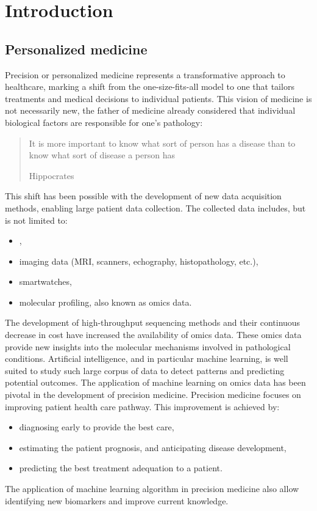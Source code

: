 \documentclass[../main.tex]{subfiles}
\begin{document}

\chapter{Introduction}
\minitoc

\section{Personalized medicine}
 Precision or personalized medicine represents a transformative approach to healthcare, marking a shift from the one-size-fits-all model to one that tailors treatments and medical decisions to individual patients.
 This vision of medicine is not necessarily new, the father of medicine already considered that individual biological factors are responsible for one's pathology: \blockquote[Hippocrates][.]{It is more important to know what sort of person has a disease than to know what sort of disease a person has}.
 This shift has been possible with the development of new data acquisition methods, enabling large patient data collection.
 The collected data includes, but is not limited to:
 \begin{itemize}[nosep]
	 \item {},
	 \item imaging data (MRI, scanners, echography, histopathology, etc.),
	 \item smartwatches,
	 \item molecular profiling, also known as omics data.
 \end{itemize}
 The development of high-throughput sequencing methods and their continuous decrease in cost have increased the availability of omics data.
 These omics data provide new insights into the molecular mechanisms involved in pathological conditions.
 Artificial intelligence, and in particular machine learning, is well suited to study such large corpus of data to detect patterns and predicting potential outcomes.
 The application of machine learning on omics data has been pivotal in the development of precision medicine.
 Precision medicine focuses on improving patient health care pathway.
 This improvement is achieved by:
 \begin{itemize}[nosep]
	 \item diagnosing early to provide the best care,
	 \item estimating the patient prognosis, and anticipating disease development,
	 \item predicting the best treatment adequation to a patient.
 \end{itemize}
 The application of machine learning algorithm in precision medicine also allow identifying new biomarkers and improve current knowledge.
\end{document}
